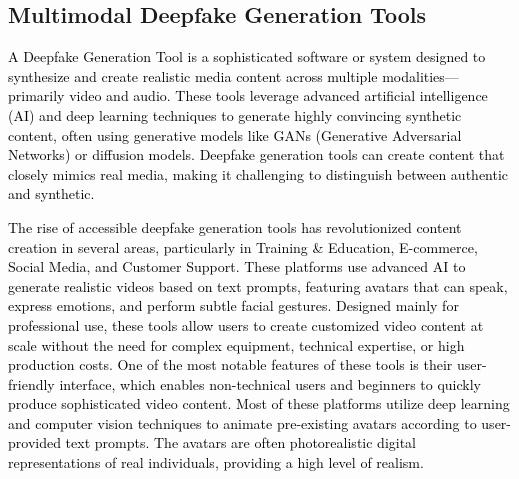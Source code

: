 \subsection{Multimodal Deepfake Generation Tools}

\textcolor{black}{A Deepfake Generation Tool is a sophisticated software or system designed to synthesize and create realistic media content across multiple modalities—primarily video and audio. These tools leverage advanced artificial intelligence (AI) and deep learning techniques to generate highly convincing synthetic content, often using generative models like GANs (Generative Adversarial Networks) or diffusion models. Deepfake generation tools can create content that closely mimics real media, making it challenging to distinguish between authentic and synthetic.}

\begin{table*}[htbp]
\caption{Top Tools to Detect Multimodal Deepfakes}
\centering
{}
\label{tab:tool_det_multimodal_deepfakes}
\end{table*}

\textcolor{black}{The rise of accessible deepfake generation tools has revolutionized content creation in several areas, particularly in Training & Education, E-commerce, Social Media, and Customer Support. These platforms use advanced AI to generate realistic videos based on text prompts, featuring avatars that can speak, express emotions, and perform subtle facial gestures. Designed mainly for professional use, these tools allow users to create customized video content at scale without the need for complex equipment, technical expertise, or high production costs. One of the most notable features of these tools is their user-friendly interface, which enables non-technical users and beginners to quickly produce sophisticated video content. Most of these platforms utilize deep learning and computer vision techniques to animate pre-existing avatars according to user-provided text prompts. The avatars are often photorealistic digital representations of real individuals, providing a high level of realism.}


